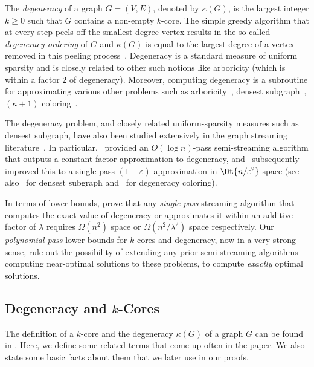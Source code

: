 \documentclass[11pt,letterpaper]{article}
\newcommand{\eps}{\varepsilon}
\renewcommand{\geq}{\geqslant}
\theoremstyle{definition}
\begin{document}
The \emph{degeneracy} of a graph $G=(V,E)$, denoted by $\kappa(G)$, is the largest integer $k \geq 0$ such that $G$ contains a non-empty $k$-core. 
The simple greedy algorithm that at every step peels off the smallest degree vertex results in the so-called \emph{degeneracy ordering} of $G$ and $\kappa{(G)}$ 
is equal to the largest degree of a vertex removed in this peeling process~\cite{MatulaB83}. Degeneracy is a standard measure of uniform sparsity and is closely
related to other such notions like arboricity (which is within a factor $2$ of degeneracy). Moreover, computing degeneracy is a subroutine for approximating various
other problems such as arboricity~\cite{AlonYZ97}, densest subgraph~\cite{Charikar00}, $(\kappa+1)$ coloring~\cite{erdHos1966chromatic}. 

The degeneracy problem, and closely related uniform-sparsity measures such as densest subgraph, have also been studied extensively in the graph 
streaming literature~\cite{BahmaniKV12,Farach-ColtonT14,BhattacharyaHNT15,McGregorTVV15,Farach-ColtonT16,BeraCG19,AlonA20}. In particular,~\cite{Farach-ColtonT14} provided an $O(\log{n})$-pass semi-streaming algorithm that outputs a constant factor approximation to degeneracy, and~\cite{Farach-ColtonT16} subsequently improved this to a single-pass $(1-\eps)$-approximation in $\Ot{n/\eps^2}$ space (see also~\cite{McGregorTVV15} for densest subgraph and~\cite{BeraCG19,AlonA20} for degeneracy coloring). 
 
\medskip

In terms of lower bounds, \cite{BeraCG19} prove that any \emph{single-pass} streaming algorithm that computes the exact value of degeneracy or approximates it within an additive factor of $\lambda$ requires $\Omega(n^2)$ space or $\Omega(n^2/\lambda^2)$ space respectively. Our \emph{polynomial-pass} lower bounds for $k$-cores and degeneracy, now in a very strong sense, rule out the possibility of extending any prior semi-streaming algorithms computing near-optimal solutions to these problems, to compute \emph{exactly} optimal solutions. 


\subsection{Degeneracy and \texorpdfstring{$k$-Cores}{k-Cores}}

The definition of a $k$-core and the degeneracy $\kappa(G)$ of a graph $G$ can be found in . Here, we define some related terms that come up often in the paper. We also state some basic facts about them that we later use in our proofs. 
\end{document}
